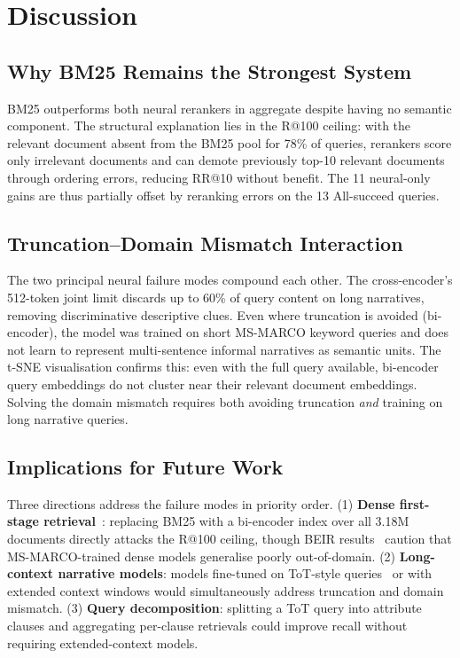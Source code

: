 \documentclass[conference]{IEEEtran}
\begin{document}
\section{Discussion}
\label{sec:discussion}

\subsection{Why BM25 Remains the Strongest System}

BM25 outperforms both neural rerankers in aggregate despite having no semantic
component.
The structural explanation lies in the R@100 ceiling: with the relevant document
absent from the BM25 pool for 78\% of queries, rerankers score only irrelevant
documents and can demote previously top-10 relevant documents through ordering
errors, reducing RR@10 without benefit.
The 11 neural-only gains are thus partially offset by reranking errors on the
13 All-succeed queries.

\subsection{Truncation--Domain Mismatch Interaction}

The two principal neural failure modes compound each other.
The cross-encoder's 512-token joint limit discards up to 60\% of query content on
long narratives, removing discriminative descriptive clues.
Even where truncation is avoided (bi-encoder), the model was trained on short
MS-MARCO keyword queries and does not learn to represent multi-sentence informal
narratives as semantic units.
The t-SNE visualisation confirms this: even with the full query available,
bi-encoder query embeddings do not cluster near their relevant document embeddings.
Solving the domain mismatch requires both avoiding truncation \textit{and} training
on long narrative queries.

\subsection{Implications for Future Work}

Three directions address the failure modes in priority order.
(1) \textbf{Dense first-stage retrieval}~\cite{karpukhin2020}: replacing BM25 with a
bi-encoder index over all 3.18M documents directly attacks the R@100 ceiling,
though BEIR results~\cite{thakur2021} caution that MS-MARCO-trained dense models
generalise poorly out-of-domain.
(2) \textbf{Long-context narrative models}: models fine-tuned on ToT-style
queries~\cite{bhatt2024} or with extended context windows would simultaneously
address truncation and domain mismatch.
(3) \textbf{Query decomposition}: splitting a ToT query into attribute clauses and
aggregating per-clause retrievals could improve recall without requiring
extended-context models.
\end{document}
